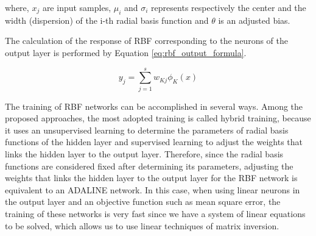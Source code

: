 where, $x_j$ are input samples, $\mu_i$ and $\sigma_i$ represents respectively the center and the width (dispersion) of the i-th radial basis function and $\theta$ is an adjusted bias.

The calculation of the response of RBF corresponding to the neurons of the output layer is performed by Equation \ref{eq:rbf_output_formula}.

\begin{equation}
\label{eq:rbf_output_formula}
y_j = \sum_{j=1}^{s} w_{Kj} \phi_K(x)   
\end{equation}

The training of RBF networks can be accomplished in several ways. Among the proposed approaches, the most adopted training is called hybrid training, because it uses an unsupervised learning to determine the parameters of radial basis functions of the hidden layer and supervised learning to adjust the weights that links the hidden layer to the output layer. Therefore, since the radial basis functions are considered fixed after determining its parameters, adjusting the weights that links the hidden layer to the output layer for the RBF network is equivalent to an ADALINE network. In this case, when using linear neurons in the output layer and an objective function such as mean square error, the training of these networks is very fast since we have a system of linear equations to be solved, which allows us to use linear techniques of matrix inversion.

